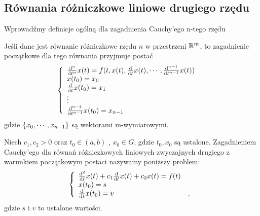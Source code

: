 \documentclass[12pt,a4paper]{report}
\begin{document}
\subsection{Równania różniczkowe liniowe drugiego rzędu }
Wprowadźmy definicje ogólną dla zagadnienia Cauchy'ego n-tego rzędu
\begin{definition}
Jeśli dane jest równanie różniczkowe rzędu $n$ w przestrzeni $\setR^m$, to zagadnienie początkowe dla tego równania przyjmuje postać 
\begin{equation} 
\left\{\begin{array}{ll}
\ddx[^n]{t^n} x(t) = f(t,x(t), \ddx{t}x(t), \cdots, \ddx[^{n-1}]{t^{n-1}}x(t)) &   \\
x(t_0) = x_0 & \\
\ddx{t}x(t_0) = x_1 & \\
\vdots & \\
\ddx[^{n-1}]{t^{n-1}}x(t_0) = x_{n-1} &
\end{array} \right.
\end{equation}
gdzie $ \set{x_0,\cdots,x_{n-1}}$ są wektorami m-wymiarowymi. 
\end{definition}

\begin{problem}
Niech $c_1 , c_2 >0 $ oraz $t_0 \in (a,b) $ , $ x_0 \in G $, gdzie $t_0, x_0$ są ustalone.
Zagadnieniem Cauchy'ego dla równań różniczkowych liniowych zwyczajnych drugiego z warunkiem początkowym postaci nazywamy poniższy problem:
\begin{equation}
\left\{\begin{array}{ll}
\ddx [^2]{t} x(t) + c_1\ddx{t} x(t) + c_2x(t) = f(t) & \\
x(t_0) = s & \\
\ddx{t} x(t_0) = v &,
\end{array} \right.
\end{equation}
gdzie $ s$ i $v$ to ustalone wartości.
\end{problem}
\end{document}
